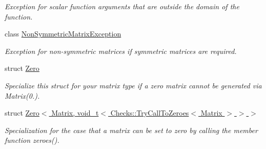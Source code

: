 \begin{DoxyCompactItemize}
\begin{DoxyCompactList}\small\item\em Exception for scalar function arguments that are outside the domain of the function. \end{DoxyCompactList}\item 
class \hyperlink{classRFFGen_1_1NonSymmetricMatrixException}{Non\-Symmetric\-Matrix\-Exception}
\begin{DoxyCompactList}\small\item\em Exception for non-\/symmetric matrices if symmetric matrices are required. \end{DoxyCompactList}\item 
struct \hyperlink{structRFFGen_1_1Zero}{Zero}
\begin{DoxyCompactList}\small\item\em Specialize this struct for your matrix type if a zero matrix cannot be generated via Matrix(0.). \end{DoxyCompactList}\item 
struct \hyperlink{structRFFGen_1_1Zero_3_01Matrix_00_01void__t_3_01Checks_1_1TryCallToZeroes_3_01Matrix_01_4_01_4_01_4}{Zero$<$ Matrix, void\-\_\-t$<$ Checks\-::\-Try\-Call\-To\-Zeroes$<$ Matrix $>$ $>$ $>$}
\begin{DoxyCompactList}\small\item\em Specialization for the case that a matrix can be set to zero by calling the member function zeroes(). \end{DoxyCompactList}\end{DoxyCompactItemize}
